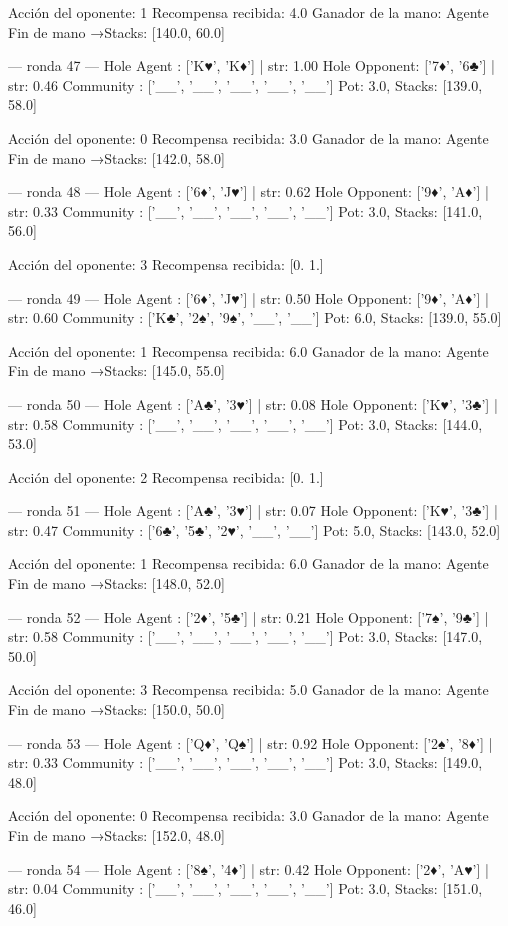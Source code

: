 Acción del oponente: 1
Recompensa recibida: 4.0
Ganador de la mano: Agente
Fin de mano →Stacks: [140.0, 60.0]


--- ronda 47 ---
Hole Agent : ['K♥', 'K♦'] | str: 1.00
Hole Opponent: ['7♦', '6♣'] | str: 0.46
Community  : ['__', '__', '__', '__', '__']
Pot: 3.0, Stacks: [139.0, 58.0]

Acción del oponente: 0
Recompensa recibida: 3.0
Ganador de la mano: Agente
Fin de mano →Stacks: [142.0, 58.0]


--- ronda 48 ---
Hole Agent : ['6♦', 'J♥'] | str: 0.62
Hole Opponent: ['9♦', 'A♦'] | str: 0.33
Community  : ['__', '__', '__', '__', '__']
Pot: 3.0, Stacks: [141.0, 56.0]

Acción del oponente: 3
Recompensa recibida: [0. 1.]

--- ronda 49 ---
Hole Agent : ['6♦', 'J♥'] | str: 0.50
Hole Opponent: ['9♦', 'A♦'] | str: 0.60
Community  : ['K♣', '2♠', '9♠', '__', '__']
Pot: 6.0, Stacks: [139.0, 55.0]

Acción del oponente: 1
Recompensa recibida: 6.0
Ganador de la mano: Agente
Fin de mano →Stacks: [145.0, 55.0]


--- ronda 50 ---
Hole Agent : ['A♣', '3♥'] | str: 0.08
Hole Opponent: ['K♥', '3♣'] | str: 0.58
Community  : ['__', '__', '__', '__', '__']
Pot: 3.0, Stacks: [144.0, 53.0]

Acción del oponente: 2
Recompensa recibida: [0. 1.]

--- ronda 51 ---
Hole Agent : ['A♣', '3♥'] | str: 0.07
Hole Opponent: ['K♥', '3♣'] | str: 0.47
Community  : ['6♣', '5♣', '2♥', '__', '__']
Pot: 5.0, Stacks: [143.0, 52.0]

Acción del oponente: 1
Recompensa recibida: 6.0
Ganador de la mano: Agente
Fin de mano →Stacks: [148.0, 52.0]


--- ronda 52 ---
Hole Agent : ['2♦', '5♣'] | str: 0.21
Hole Opponent: ['7♠', '9♣'] | str: 0.58
Community  : ['__', '__', '__', '__', '__']
Pot: 3.0, Stacks: [147.0, 50.0]

Acción del oponente: 3
Recompensa recibida: 5.0
Ganador de la mano: Agente
Fin de mano →Stacks: [150.0, 50.0]


--- ronda 53 ---
Hole Agent : ['Q♦', 'Q♠'] | str: 0.92
Hole Opponent: ['2♠', '8♦'] | str: 0.33
Community  : ['__', '__', '__', '__', '__']
Pot: 3.0, Stacks: [149.0, 48.0]

Acción del oponente: 0
Recompensa recibida: 3.0
Ganador de la mano: Agente
Fin de mano →Stacks: [152.0, 48.0]


--- ronda 54 ---
Hole Agent : ['8♠', '4♦'] | str: 0.42
Hole Opponent: ['2♦', 'A♥'] | str: 0.04
Community  : ['__', '__', '__', '__', '__']
Pot: 3.0, Stacks: [151.0, 46.0]

